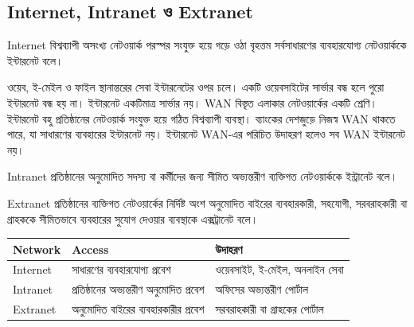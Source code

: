 \subsection{Internet, Intranet ও Extranet}

\begin{definitionbox}{Internet}
বিশ্বব্যাপী অসংখ্য নেটওয়ার্ক পরস্পর সংযুক্ত হয়ে গড়ে ওঠা বৃহত্তম সর্বসাধারণের ব্যবহারযোগ্য নেটওয়ার্ককে ইন্টারনেট বলে।
\end{definitionbox}
ওয়েব, ই-মেইল ও ফাইল স্থানান্তরের সেবা ইন্টারনেটের ওপর চলে। একটি ওয়েবসাইটের সার্ভার বন্ধ হলে পুরো ইন্টারনেট বন্ধ হয় না। ইন্টারনেট একটিমাত্র সার্ভার নয়।
WAN বিস্তৃত এলাকার নেটওয়ার্কের একটি শ্রেণি। ইন্টারনেট বহু প্রতিষ্ঠানের নেটওয়ার্ক সংযুক্ত হয়ে গঠিত বিশ্বব্যাপী ব্যবস্থা। ব্যাংকের দেশজুড়ে নিজস্ব WAN থাকতে পারে, যা সাধারণের ব্যবহারের ইন্টারনেট নয়। ইন্টারনেট WAN-এর পরিচিত উদাহরণ হলেও সব WAN ইন্টারনেট নয়।

\begin{definitionbox}{Intranet}
প্রতিষ্ঠানের অনুমোদিত সদস্য বা কর্মীদের জন্য সীমিত অভ্যন্তরীণ ব্যক্তিগত নেটওয়ার্ককে ইন্ট্রানেট বলে।
\end{definitionbox}

\begin{definitionbox}{Extranet}
প্রতিষ্ঠানের ব্যক্তিগত নেটওয়ার্কের নির্দিষ্ট অংশ অনুমোদিত বাইরের ব্যবহারকারী, সহযোগী, সরবরাহকারী বা গ্রাহককে সীমিতভাবে ব্যবহারের সুযোগ দেওয়ার ব্যবস্থাকে এক্সট্রানেট বলে।
\end{definitionbox}




\begin{center}
\begin{tabular}{|p{}|p{}|p{}|}
\hline
\textbf{Network} & \textbf{Access} & \textbf{উদাহরণ} \\
\hline
Internet & সাধারণের ব্যবহারযোগ্য প্রবেশ & ওয়েবসাইট, ই-মেইল, অনলাইন সেবা \\
\hline
Intranet & প্রতিষ্ঠানের অভ্যন্তরীণ অনুমোদিত প্রবেশ & অফিসের অভ্যন্তরীণ পোর্টাল \\
\hline
Extranet & অনুমোদিত বাইরের ব্যবহারকারীর প্রবেশ & সরবরাহকারী বা গ্রাহকের পোর্টাল \\
\hline
\end{tabular}
\end{center}

